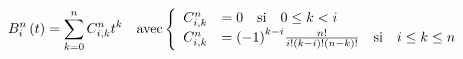 \documentclass{amsart}
\begin{document}
  \pagestyle{empty}

  \begin{equation*}
      B_{i}^{n}\left(t\right) = \sum_{k=0}^{n} C_{i, k}^{n} t^{k} \quad \text{avec} \quad \\
      \left \{
        \begin{array}{ll}
          C_{i, k}^{n} & = 0 \quad \text{si} \quad 0 \leq k < i \\
          C_{i, k}^{n} & = {\left(-1\right)}^{k-i} \frac{n!}{i! {\left({k-i}\right)!} {\left({n-k}\right)!}} \quad \text{si} \quad i \leq k \leq n \\
        \end{array}
      \right.
  \end{equation*}
\end{document}
